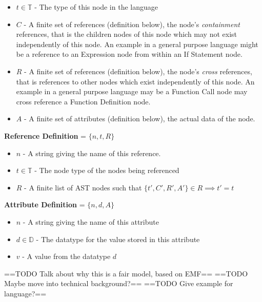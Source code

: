 \documentclass{report}
\begin{document}
\begin{itemize}
\item $t\in \mathbb{T}$ - The type of this node in the language
\item $C$ - A finite set of references (definition below), the node's \emph{containment} references, that is the children nodes of this node which may not exist independently of this node. An example in a general purpose language might be a reference to an Expression node from within an If Statement node.
\item $R$ - A finite set of references (definition below), the node's \emph{cross} references, that is references to other nodes which exist independently of this node. An example in a general purpose language may be a Function Call node may cross reference a Function Definition node.
\item $A$ - A finite set of attributes (definition below), the actual data of the node.
\end{itemize}
%
\textbf{Reference Definition} = $\{n,t,R\}$ 
\begin{itemize}
\item $n$ - A string giving the name of this reference.
\item $t\in \mathbb{T}$ - The node type of the nodes being referenced 
\item $R$ - A finite list of AST nodes such that $\{t',C',R',A'\} \in R \implies t'=t$
\end{itemize}
%
\textbf{Attribute Definition} = $\{n,d,A\}$ 
\begin{itemize}
\item $n$ - A string giving the name of this attribute
\item $d\in \mathbb{D}$ - The datatype for the value stored in this attribute
\item $v$ - A value from the datatype $d$
\end{itemize}


==TODO Talk about why this is a fair model, based on EMF== 
==TODO Maybe move into technical background?== 
==TODO Give example for language?==
\end{document}
